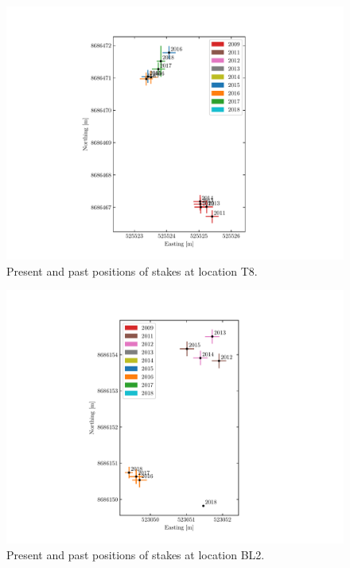 \begin{figure}[H]
    \centering
    \includegraphics[width=.9\textwidth]{./figs/T8_2d.pdf}
    \caption{Present and past positions of stakes at location T8.}
    \label{GPS:fig:T8_2d}
\end{figure}

\begin{figure}[H]
    \centering
    \includegraphics[width=.9\textwidth]{./figs/BL2_2d.pdf}
    \caption{Present and past positions of stakes at location BL2.}
    \label{GPS:fig:BL2_2d}
\end{figure}


